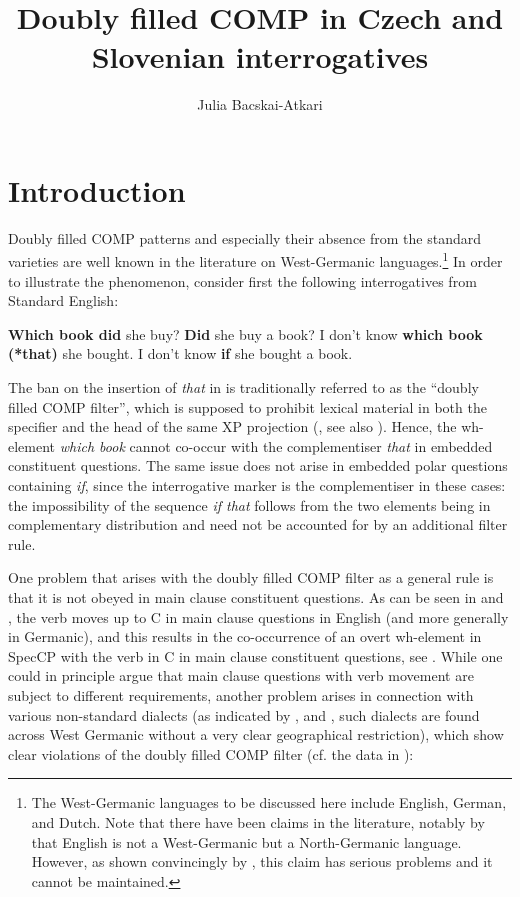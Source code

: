\documentclass[output=paper,
modfonts, hidelinks, newtxmath
]{langscibook}
\title{Doubly filled COMP in Czech and Slovenian interrogatives}
\author{%
 Julia Bacskai-Atkari\affiliation{University of Potsdam}
}
\begin{document}
\maketitle
{}
\section{Introduction} 
Doubly filled COMP patterns and especially their absence from the standard varieties are well known in the literature on West-Germanic languages.\footnote{The West-Germanic languages to be discussed here include English, German, and Dutch. Note that there have been claims in the literature, notably by \citet{emondsfaarlund2014} that English is not a West-Germanic but a North-Germanic language. However, as shown convincingly by \citet{bechwalkden2016}, this claim has serious problems and it cannot be maintained.} In order to illustrate the phenomenon, consider first the following interrogatives from Standard English:

\ea
	\ea \textbf{Which book did} she buy? \label{whichbookdid}
	\ex \textbf{Did} she buy a book? \label{did}
	\ex I don't know \textbf{which book (*that)} she bought. \label{whichbook}
	\ex I don't know \textbf{if} she bought a book. \label{if}
	\z
\z

\noindent The ban on the insertion of \textit{that} in  is traditionally referred to as the ``doubly filled COMP filter'', which is supposed to prohibit lexical material in both the specifier and the head of the same XP projection (\citealt[446]{chomskylasnik1977}, see also \citealt{koopman2000}). Hence, the wh-element \textit{which book} cannot co-occur with the complementiser \textit{that} in embedded constituent questions. The same issue does not arise in embedded polar questions containing \textit{if}, since the interrogative marker is the complementiser in these cases: the impossibility of the sequence \textit{if that} follows from the two elements being in complementary distribution and need not be accounted for by an additional filter rule.

One problem that arises with the doubly filled COMP filter as a general rule is that it is not obeyed in main clause constituent questions. As can be seen in  and , the verb moves up to C in main clause questions in English (and more generally in Germanic), and this results in the co-occurrence of an overt wh-element in SpecCP with the verb in C in main clause constituent questions, see . While one could in principle argue that main clause questions with verb movement are subject to different requirements, another problem arises in connection with various non-standard dialects (as indicated by \citealt{vangelderen2009}, \citealt{bayer2004} and \citealt{bayerbrandner2008}, such dialects are found across West Germanic without a very clear geographical restriction), which show clear violations of the doubly filled COMP filter (cf. the data in \citealt{baltin2010}):
\end{document}
